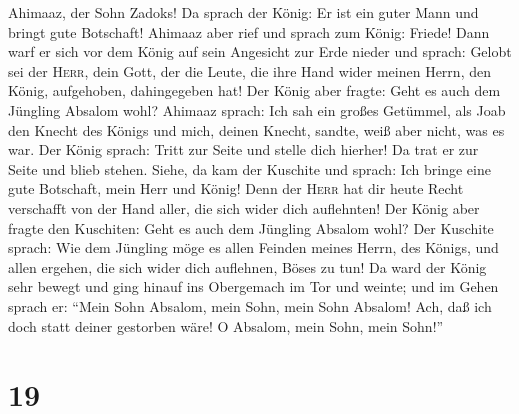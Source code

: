 Ahimaaz, der Sohn Zadoks! Da sprach der König: Er ist ein guter Mann und
bringt gute Botschaft!  Ahimaaz aber rief und sprach zum
König: Friede! Dann warf er sich vor dem König auf sein Angesicht zur
Erde nieder und sprach: Gelobt sei der \textsc{Herr}, dein Gott, der die
Leute, die ihre Hand wider meinen Herrn, den König, aufgehoben,
dahingegeben hat!  Der König aber fragte: Geht es auch
dem Jüngling Absalom wohl? Ahimaaz sprach: Ich sah ein großes Getümmel,
als Joab den Knecht des Königs und mich, deinen Knecht, sandte, weiß
aber nicht, was es war.  Der König sprach: Tritt zur
Seite und stelle dich hierher! Da trat er zur Seite und blieb stehen.
 Siehe, da kam der Kuschite und sprach: Ich bringe eine
gute Botschaft, mein Herr und König! Denn der \textsc{Herr} hat dir
heute Recht verschafft von der Hand aller, die sich wider dich
auflehnten!  Der König aber fragte den Kuschiten: Geht es
auch dem Jüngling Absalom wohl? Der Kuschite sprach: Wie dem Jüngling
möge es allen Feinden meines Herrn, des Königs, und allen ergehen, die
sich wider dich auflehnen, Böses zu tun!  Da ward der
König sehr bewegt und ging hinauf ins Obergemach im Tor und weinte; und
im Gehen sprach er: ``Mein Sohn Absalom, mein Sohn, mein Sohn Absalom!
Ach, daß ich doch statt deiner gestorben wäre! O Absalom, mein Sohn,
mein Sohn!''

\hypertarget{section-18}{%
\section{19}\label{section-18}}

